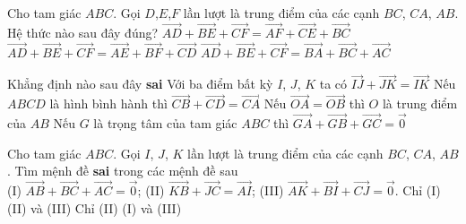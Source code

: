 \begin{ex}%
	Cho tam giác $ABC$. Gọi $D$,$E$,$F$ lần lượt là trung điểm của các cạnh $BC$, $CA$, $AB$. Hệ thức nào sau đây đúng?
	{$\vec{AD}+\vec{BE}+\vec{CF}=\vec{AF}+\vec{CE}+\vec{BC}$}
	{\True $\vec{AD}+\vec{BE}+\vec{CF}=\vec{AE}+\vec{BF}+\vec{CD}$}
	{$\vec{AD}+\vec{BE}+\vec{CF}=\vec{BA}+\vec{BC}+\vec{AC}$}
\end{ex}
\begin{ex}%
	Khẳng định nào sau đây \textbf{sai}
	\choice
	{
		Với ba điểm bất kỳ $I$, $J$, $K$ ta có $\vec{IJ}+\vec{JK}=\vec{IK}$}
	{
		Nếu $ABCD$ là hình bình hành thì  $\vec{CB}+\vec{CD}=\vec{CA}$}
	{
		\True Nếu $\vec{OA}=\vec{OB}$ thì $O$ là trung điểm của $AB$}
	{
		Nếu $G$ là trọng tâm của tam giác $ABC$ thì $\vec{GA}+\vec{GB}+\vec{GC}=\vec{0}$}
\end{ex}
\begin{ex}%
	Cho tam giác $ABC$. Gọi $I$, $J$, $K$ lần lượt là trung điểm của các cạnh $BC$, $CA$, $AB$. Tìm mệnh đề \textbf{sai} trong các mệnh đề sau \\
	(I) $\vec{AB}+\vec{BC}+\vec{AC}=\vec{0}$; \hspace{0.5cm}
	(II) $\vec{KB}+\vec{JC}=\vec{AI}$; \hspace{0.5cm}
	(III) $\vec{AK}+\vec{BI}+\vec{CJ}=\vec{0}$.
	\choice
	{
		\True Chỉ (I)}
	{
		(II) và (III)}
	{
		Chỉ (II)}
	{
		(I) và (III)}
\end{ex}




